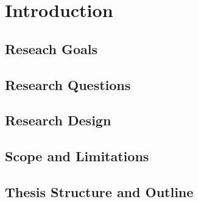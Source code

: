 \chapter{Introduction\label{cha:intro}}


\section{Reseach Goals}

\section{Research Questions}

\section{Research Design}

\section{Scope and Limitations}

\section{Thesis Structure and Outline}
